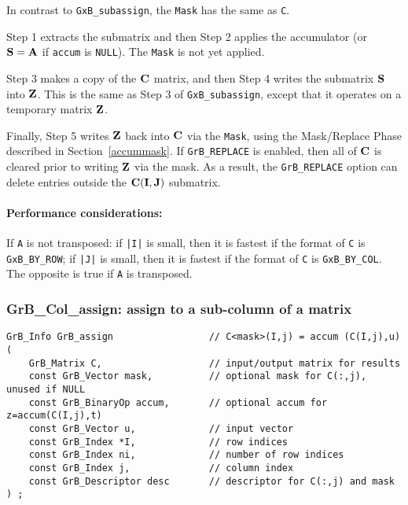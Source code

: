 \documentclass[12pt]{article}
\begin{document}
In contrast to \verb'GxB_subassign', the \verb'Mask' has the same as \verb'C'.

Step 1 extracts the submatrix and then Step 2 applies the accumulator
(or ${\bf S}={\bf A}$ if \verb'accum' is \verb'NULL').  The \verb'Mask' is
not yet applied.

Step 3 makes a copy of the ${\bf C}$ matrix, and then Step 4 writes the
submatrix ${\bf S}$ into ${\bf Z}$.  This is the same as Step 3 of
\verb'GxB_subassign', except that it operates on a temporary matrix ${\bf Z}$.

Finally, Step 5 writes ${\bf Z}$ back into ${\bf C}$ via the \verb'Mask', using
the Mask/Replace Phase described in Section~\ref{accummask}.  If
\verb'GrB_REPLACE' is enabled, then all of ${\bf C}$ is cleared prior to
writing ${\bf Z}$ via the mask.  As a result, the \verb'GrB_REPLACE' option can
delete entries outside the ${\bf C(I,J)}$ submatrix.

\paragraph{\bf Performance considerations:} %
If \verb'A' is not transposed: if \verb'|I|' is small, then it is fastest if
the format of \verb'C' is \verb'GxB_BY_ROW'; if \verb'|J|' is small, then it is
fastest if the format of \verb'C' is \verb'GxB_BY_COL'.  The opposite is true
if \verb'A' is transposed.

\newpage
\subsubsection{{\sf GrB\_Col\_assign:} assign to a sub-column of a matrix}
\label{assign_column}

\begin{mdframed}[userdefinedwidth=6in]
{\footnotesize
\begin{verbatim}
GrB_Info GrB_assign                 // C<mask>(I,j) = accum (C(I,j),u)
(
    GrB_Matrix C,                   // input/output matrix for results
    const GrB_Vector mask,          // optional mask for C(:,j), unused if NULL
    const GrB_BinaryOp accum,       // optional accum for z=accum(C(I,j),t)
    const GrB_Vector u,             // input vector
    const GrB_Index *I,             // row indices
    const GrB_Index ni,             // number of row indices
    const GrB_Index j,              // column index
    const GrB_Descriptor desc       // descriptor for C(:,j) and mask
) ;
\end{verbatim} } \end{mdframed}
\end{document}
